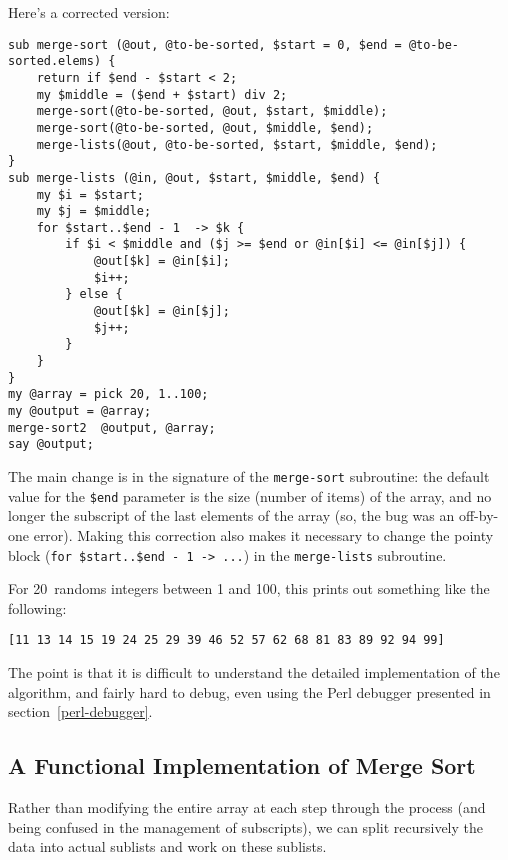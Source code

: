 Here's a corrected version:

\begin{verbatim}
sub merge-sort (@out, @to-be-sorted, $start = 0, $end = @to-be-sorted.elems) {
    return if $end - $start < 2;
    my $middle = ($end + $start) div 2;
    merge-sort(@to-be-sorted, @out, $start, $middle);
    merge-sort(@to-be-sorted, @out, $middle, $end);
    merge-lists(@out, @to-be-sorted, $start, $middle, $end);
}
sub merge-lists (@in, @out, $start, $middle, $end) {
    my $i = $start;
    my $j = $middle;
    for $start..$end - 1  -> $k {
        if $i < $middle and ($j >= $end or @in[$i] <= @in[$j]) {
            @out[$k] = @in[$i];
            $i++;
        } else {
            @out[$k] = @in[$j];
            $j++;
        } 
    }
}
my @array = pick 20, 1..100;
my @output = @array;
merge-sort2  @output, @array;
say @output;
\end{verbatim}

The main change is in the signature of the \verb'merge-sort' 
subroutine: the default value for the \verb'$end' parameter 
is the size (number of items) of the array, and no 
longer the subscript of the last elements of the array (so, 
the bug was an off-by-one error). Making this correction 
also makes it necessary to change the pointy block 
(\verb'for $start..$end - 1 -> ...') in the 
\verb'merge-lists' subroutine.

For 20~randoms integers between 1 and 100, this prints 
out something like the following:

\begin{verbatim}
[11 13 14 15 19 24 25 29 39 46 52 57 62 68 81 83 89 92 94 99]
\end{verbatim}

The point is that it is difficult to understand the detailed 
implementation of the algorithm, and fairly hard to debug, even 
using the Perl debugger presented in section~\ref{perl-debugger}.

\subsection{A Functional Implementation of Merge Sort}
Rather than modifying the entire array at each step through 
the process (and being confused in the management of subscripts), 
we can split recursively the data into actual sublists and work 
on these sublists.

